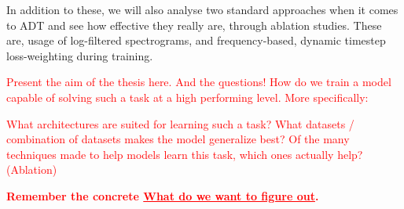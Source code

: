 In addition to these, we will also analyse two standard approaches when it comes to \gls{ADT} and see how effective they really are, through ablation studies. These are, usage of log-filtered spectrograms, and frequency-based, dynamic timestep loss-weighting during training. 

\textcolor{red}{
    Present the aim of the thesis here. And the \b{questions!}
How do we train a model capable of solving such a task at a high performing level. More specifically:
}


\textcolor{red}{
What architectures are suited for learning such a task?
What datasets / combination of datasets makes the model generalize best?
Of the many techniques made to help models learn this task, which ones actually help? (Ablation)
}

\textcolor{red}{\textbf{Remember the concrete \underline{What do we want to figure out}.}}